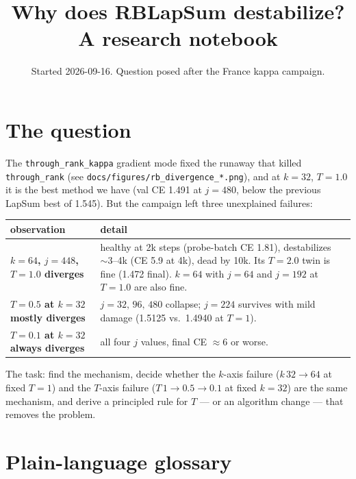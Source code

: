 \documentclass[11pt,a4paper]{article}
\title{Why does RBLapSum \code{through\_rank\_kappa} destabilize?\\[2pt]
\large A research notebook}
\author{}
\date{Started 2026-09-16. Question posed after the France kappa campaign.}
\newcommand{\code}[1]{\texttt{#1}}
\begin{document}
\maketitle
\vspace{-2em}
\tableofcontents

\section{The question}

The \code{through\_rank\_kappa} gradient mode fixed the runaway that killed
\code{through\_rank} (see \code{docs/figures/}\allowbreak\code{rb\_divergence\_*.png}), and at
$k=32$, $T=1.0$ it is the best method we have (val CE 1.491 at $j=480$, below
the previous LapSum best of 1.545). But the campaign left three unexplained
failures:

\begin{center}\small
\begin{tabular}{p{4.2cm}p{9.6cm}}
\toprule
observation & detail \\
\midrule
\textbf{$k{=}64$, $j{=}448$, $T{=}1.0$ diverges} & healthy at 2k steps
(probe-batch CE 1.81), destabilizes ${\sim}3$--4k (CE 5.9 at 4k), dead by 10k.
Its $T{=}2.0$ twin is fine (1.472 final). $k{=}64$ with $j{=}64$ and $j{=}192$
at $T{=}1.0$ are also fine. \\[2pt]
\textbf{$T{=}0.5$ at $k{=}32$ mostly diverges} & $j=32,\,96,\,480$ collapse;
$j{=}224$ survives with mild damage (1.5125 vs.\ 1.4940 at $T{=}1$). \\[2pt]
\textbf{$T{=}0.1$ at $k{=}32$ always diverges} & all four $j$ values, final
CE $\approx 6$ or worse. \\
\bottomrule
\end{tabular}
\end{center}

The task: find the mechanism, decide whether the $k$-axis failure ($k\,32\to64$
at fixed $T{=}1$) and the $T$-axis failure ($T\,1\to0.5\to0.1$ at fixed
$k{=}32$) are the same mechanism, and derive a principled rule for $T$ --- or
an algorithm change --- that removes the problem.

\section{Plain-language glossary}
\end{document}

